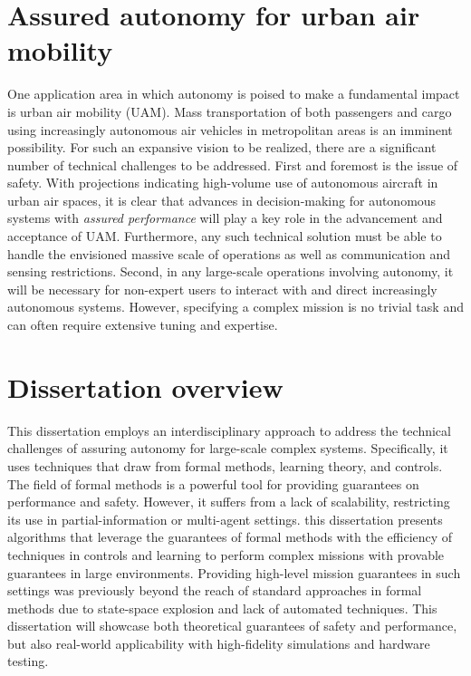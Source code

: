 \section{Assured autonomy for urban air mobility} One application area in which autonomy is poised to make a fundamental impact is urban air mobility (UAM). Mass transportation of both passengers and cargo using increasingly autonomous air vehicles in metropolitan areas is an imminent possibility. For such an expansive vision to be realized, there are a significant number of technical challenges to be addressed.  First and foremost is the issue of safety. With projections indicating high-volume use of autonomous aircraft in urban air spaces, it is clear that advances in decision-making for autonomous systems with \emph{assured performance} will play a key role in the advancement and acceptance of UAM. Furthermore, any such technical solution must be able to handle the envisioned massive scale of operations as well as communication and sensing restrictions. Second, in any large-scale operations involving autonomy, it will be necessary for non-expert users to interact with and direct increasingly autonomous systems. However, specifying a complex mission is no trivial task and can often require extensive tuning and expertise. 

\section{Dissertation overview}

This dissertation employs an interdisciplinary approach to address the technical challenges of assuring autonomy for large-scale complex systems. Specifically, it uses techniques that draw from formal methods, learning theory, and controls. The field of formal methods is a powerful tool for providing guarantees on performance and safety. However, it suffers from a lack of scalability, restricting its use in partial-information or multi-agent settings. this dissertation presents algorithms that leverage the guarantees of formal methods with the efficiency of techniques in controls and learning to perform complex missions with provable guarantees in large environments. Providing high-level mission guarantees in such settings was previously beyond the reach of standard approaches in formal methods due to state-space explosion and lack of automated techniques. This dissertation will showcase both theoretical guarantees of safety and performance, but also real-world applicability with high-fidelity simulations and hardware testing. 

